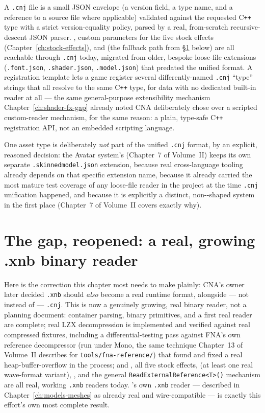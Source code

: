 A \texttt{.cnj} file is a small JSON envelope (a version field, a type name, and a reference
to a source file where applicable) validated against the requested C\texttt{++} type with a
strict version-equality policy, parsed by a real, from-scratch recursive-descent JSON parser.
, custom  parameters for the five stock effects
(Chapter~\ref{ch:stock-effects}), and  (the fallback path from
\S\ref{sec:xnb-and-cnj-model} below) are all reachable through \texttt{.cnj} today, migrated
from older, bespoke loose-file extensions (\texttt{.font.json}, \texttt{.shader.json},
\texttt{.model.json}) that predated the unified format. A registration template lets a game
register several differently-named \texttt{.cnj} ``type'' strings that all resolve to the
same C\texttt{++} type, for data with no dedicated built-in reader at all --- the same
general-purpose extensibility mechanism Chapter~\ref{ch:shader-fx-gap} already noted CNA
deliberately chose over a scripted custom-reader mechanism, for the same reason: a plain,
type-safe C\texttt{++} registration API, not an embedded scripting language.

One asset type is deliberately \emph{not} part of the unified \texttt{.cnj} format, by an
explicit, reasoned decision: the Avatar system's 
(Chapter~7 of Volume~II) keeps its own separate \texttt{.skinnedmodel.json} extension,
because real cross-language tooling already depends on that specific extension name, because
it already carried the most mature test coverage of any loose-file reader in the project at
the time \texttt{.cnj} unification happened, and because it is explicitly a distinct,
non--shaped system in the first place (Chapter~7 of Volume~II covers exactly
why).

\section{The gap, reopened: a real, growing .xnb binary reader}
\label{sec:xnb-and-cnj-model}

Here is the correction this chapter most needs to make plainly: CNA's owner later decided
\texttt{.xnb} should \emph{also} become a real runtime format, alongside --- not instead of
--- \texttt{.cnj}. This is now a genuinely growing, real binary reader, not a planning
document: container parsing, binary primitives, and a first real  reader
are complete; real LZX decompression is implemented and verified against real compressed
fixtures, including a differential-testing pass against FNA's own reference decompressor
(run under Mono, the same technique Chapter~13 of Volume~II describes for
\texttt{tools/fna-reference/}) that found and fixed a real heap-buffer-overflow in the
process; and , all five stock effects,  (at least
one real wave-format variant), , and the general
\texttt{ReadExternalReference<T>()} mechanism are all real, working \texttt{.xnb} readers
today. 's own \texttt{.xnb} reader --- described in
Chapter~\ref{ch:models-meshes} as already real and wire-compatible --- is exactly this
effort's own most complete result.

